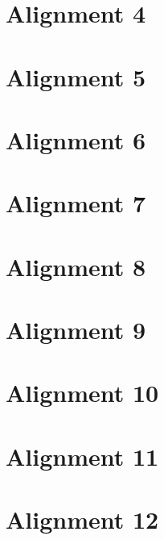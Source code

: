 \documentclass{scrartcl}
\begin{document}
\section{Alignment 4}
\label{sec:align_4}
\clearpage

\section{Alignment 5}
\label{sec:align_5}
\clearpage

\section{Alignment 6}
\label{sec:align_6}
\clearpage

\section{Alignment 7}
\label{sec:align_7}
\clearpage

\section{Alignment 8}
\label{sec:align_8}
\clearpage

\section{Alignment 9}
\label{sec:align_9}
\clearpage

\section{Alignment 10}
\label{sec:align_10}
\clearpage

\section{Alignment 11}
\label{sec:align_11}
\clearpage

\section{Alignment 12}
\label{sec:align_12}
\clearpage
\end{document}
